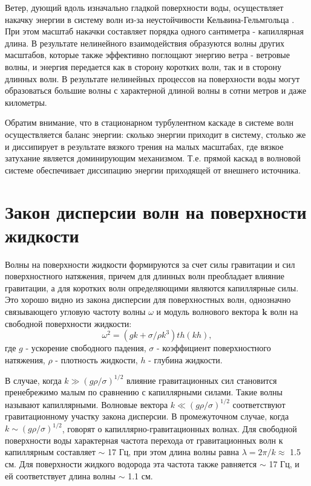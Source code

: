 Ветер, дующий вдоль изначально гладкой поверхности   воды, осуществляет накачку энергии в систему волн из-за неустойчивости Кельвина-Гельмгольца \cite[c. 99]{NonLinearWaves}. При этом масштаб накачки составляет порядка одного сантиметра - капиллярная длина. В результате нелинейного взаимодействия образуются волны других масштабов, которые также эффективно поглощают энергию ветра - ветровые волны, и энергия передается как в сторону коротких волн, так и в сторону длинных волн. В результате нелинейных процессов на поверхности воды могут образоваться большие волны с характерной длиной волны в сотни метров и даже километры. 

Обратим внимание, что в стационарном турбулентном каскаде в системе волн осуществляется баланс энергии: сколько энергии приходит в систему, столько же и диссипирует в результате вязкого трения на малых масштабах, где вязкое затухание является доминирующим механизмом. Т.е. прямой каскад в волновой системе обеспечивает диссипацию энергии приходящей от внешнего источника. 


\section{Закон дисперсии волн на поверхности жидкости}%

Волны на поверхности жидкости формируются за счет силы гравитации и сил поверхностного натяжения, причем для длинных волн преобладает влияние гравитации, а для коротких волн определяющими являются капиллярные силы. Это хорошо видно из закона дисперсии для поверхностных волн, однозначно связывающего угловую частоту волны $\omega$ и модуль волнового вектора $\mathbf{k}$ волн на свободной поверхности жидкости:
\begin{equation}
 \label{eq:disper_dip}
\omega^2 = (gk + \sigma/\rho k^3)th(kh),
\end{equation}
где $g$ - ускорение свободного падения, $\sigma$ - коэффициент поверхностного натяжения, $\rho$ - плотность жидкости, $h$ - глубина жидкости.

В случае, когда $k \gg (g\rho/\sigma)^{1/2}$ влияние гравитационных сил становится пренебрежимо малым по сравнению с капиллярными силами. Такие волны называют капиллярными. Волновые вектора $k \ll (g\rho/\sigma)^{1/2}$ соответствуют гравитационному участку закона дисперсии. В промежуточном случае, когда $k \sim (g\rho/\sigma)^{1/2}$, говорят о капиллярно-гравитационных волнах. Для свободной поверхности воды характерная частота перехода от гравитационных волн к капиллярным составляет $\sim$ 17 Гц, при этом длина волны равна $\lambda = 2\pi/k \approx$ 1.5 см. Для поверхности жидкого водорода эта частота также равняется $\sim$ 17 Гц, и ей соответствует длина волны $\sim$ 1.1 см.


